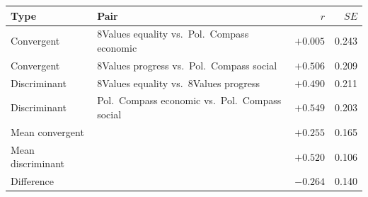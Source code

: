 \begin{tabular}{llrr}
\toprule
Type & Pair & $r$ & $SE$ \\
\midrule
Convergent & 8Values equality vs.\ Pol.\ Compass economic & $+0.005$ & 0.243 \\
Convergent & 8Values progress vs.\ Pol.\ Compass social & $+0.506$ & 0.209 \\
Discriminant & 8Values equality vs.\ 8Values progress & $+0.490$ & 0.211 \\
Discriminant & Pol.\ Compass economic vs.\ Pol.\ Compass social & $+0.549$ & 0.203 \\
\midrule
Mean convergent & & $+0.255$ & 0.165 \\
Mean discriminant & & $+0.520$ & 0.106 \\
Difference & & $-0.264$ & 0.140 \\
\bottomrule
\end{tabular}
